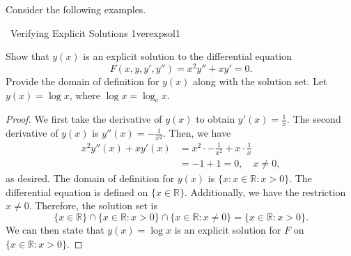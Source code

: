         \vphantom
        \\
        \\
        Consider the following examples.
        \begin{example}{\Difficulty\,\Difficulty\,\,Verifying Explicit Solutions 1}{verexpsol1}
        
            Show that \(y(x)\) is an explicit solution to the differential equation
            \begin{equation*}
                F(x,y,y',y'')=x^2y''+xy'=0.
            \end{equation*}
            Provide the domain of definition for \(y(x)\) along with the solution set. Let \(y(x)=\log x\), where \(\log x=\log_e x\).
            \begin{proof}
                We first take the derivative of \(y(x)\) to obtain \(y'(x)=\frac{1}{x}\). The second derivative of \(y(x)\) is \(y''(x)=-\frac{1}{x^2}\). Then, we have
                \begin{align*}
                    x^2y''(x)+xy'(x)&=x^2\cdot-\frac{1}{x^2}+x\cdot\frac{1}{x} \\
                    &=-1+1=0,\quad x\neq0,
                \end{align*}
                as desired. The domain of definition for \(y(x)\) is \(\{x:x\in \mathbb{R}:x>0\}\). The differential equation is defined on \(\{x\in\mathbb{R}\}\). Additionally, we have the restriction \(x\neq 0\). Therefore, the solution set is 
                \begin{equation*}
                    \{x\in\mathbb{R}\}\cap\{x\in\mathbb{R}:x>0\}\cap\{x\in\mathbb{R}:x\neq0\}=\{x\in\mathbb{R}:x>0\}.
                \end{equation*}
                We can then state that \(y(x)=\log x\) is an explicit solution for \(F\) on \(\{x\in\mathbb{R}:x>0\}\).
            \end{proof}

        \end{example}

